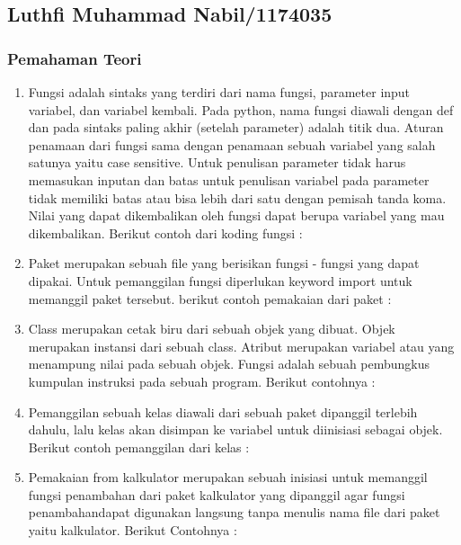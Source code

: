 \subsection{Luthfi Muhammad Nabil/1174035}
\subsubsection{Pemahaman Teori}
\begin{enumerate}
	\item Fungsi adalah sintaks yang terdiri dari nama fungsi, parameter input variabel, dan variabel kembali. Pada python, nama fungsi diawali dengan def dan pada sintaks paling akhir (setelah parameter) adalah titik dua. Aturan penamaan dari fungsi sama dengan penamaan sebuah variabel yang salah satunya yaitu case sensitive. Untuk penulisan parameter tidak harus memasukan inputan dan batas untuk penulisan variabel pada parameter tidak memiliki batas atau bisa lebih dari satu dengan pemisah tanda koma. Nilai yang dapat dikembalikan oleh fungsi dapat berupa variabel yang mau dikembalikan. Berikut contoh dari koding fungsi : 
	
	\item Paket merupakan sebuah file yang berisikan fungsi - fungsi yang dapat dipakai. Untuk pemanggilan fungsi diperlukan keyword import untuk memanggil paket tersebut. berikut contoh pemakaian dari paket : 
	
	\item Class merupakan cetak biru dari sebuah objek yang dibuat. Objek merupakan instansi dari sebuah class. Atribut merupakan variabel atau yang menampung nilai pada sebuah objek. Fungsi adalah sebuah pembungkus kumpulan instruksi pada sebuah program. Berikut contohnya : 
	
	\item Pemanggilan sebuah kelas diawali dari sebuah paket dipanggil terlebih dahulu, lalu kelas akan disimpan ke variabel untuk diinisiasi sebagai objek. Berikut contoh pemanggilan dari kelas : 
	
	\item Pemakaian from kalkulator merupakan sebuah inisiasi untuk memanggil fungsi penambahan dari paket kalkulator yang dipanggil agar fungsi penambahandapat digunakan langsung tanpa menulis nama file dari paket yaitu kalkulator. Berikut Contohnya : 
	

\end{enumerate}
